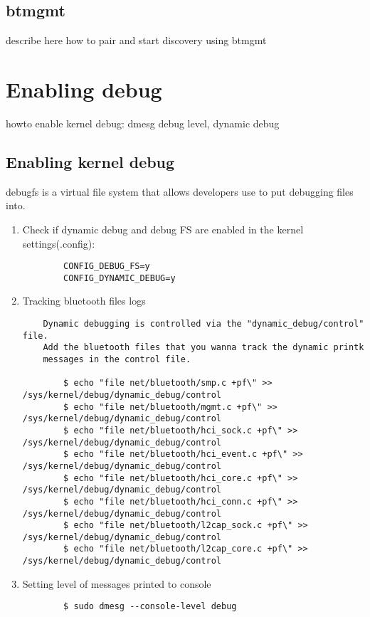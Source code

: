 \documentclass[11pt]{article}
\begin{document}
\subsection{btmgmt}
describe here how to pair and start discovery using btmgmt


\section{Enabling debug}

howto enable kernel debug: dmesg debug level, dynamic debug

\subsection{Enabling kernel debug}

debugfs is a virtual file system that allows developers use to put debugging files into.

\begin{enumerate}
	\item Check if dynamic debug and debug FS are enabled in the kernel settings(.config):

	\begin{verbatim}
		CONFIG_DEBUG_FS=y
		CONFIG_DYNAMIC_DEBUG=y
	\end{verbatim}

	\item Tracking bluetooth files logs

	\begin{verbatim}
	Dynamic debugging is controlled via the "dynamic_debug/control" file.
	Add the bluetooth files that you wanna track the dynamic printk
	messages in the control file.

		$ echo "file net/bluetooth/smp.c +pf\" >> /sys/kernel/debug/dynamic_debug/control
		$ echo "file net/bluetooth/mgmt.c +pf\" >> /sys/kernel/debug/dynamic_debug/control
		$ echo "file net/bluetooth/hci_sock.c +pf\" >> /sys/kernel/debug/dynamic_debug/control
		$ echo "file net/bluetooth/hci_event.c +pf\" >> /sys/kernel/debug/dynamic_debug/control
		$ echo "file net/bluetooth/hci_core.c +pf\" >> /sys/kernel/debug/dynamic_debug/control
		$ echo "file net/bluetooth/hci_conn.c +pf\" >> /sys/kernel/debug/dynamic_debug/control
		$ echo "file net/bluetooth/l2cap_sock.c +pf\" >> /sys/kernel/debug/dynamic_debug/control
		$ echo "file net/bluetooth/l2cap_core.c +pf\" >> /sys/kernel/debug/dynamic_debug/control
	\end{verbatim}

	\item Setting level of messages printed to console

		\begin{verbatim}
		$ sudo dmesg --console-level debug
		\end{verbatim}
\end{enumerate}
\end{document}
